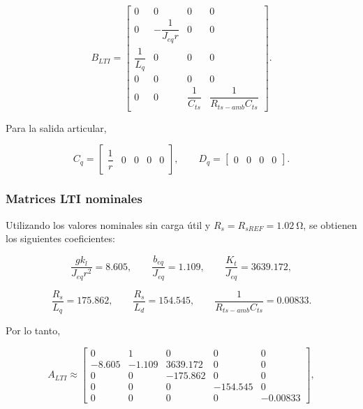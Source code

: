 \documentclass[10pt,a4paper]{article}
\begin{document}
\begin{equation}
    B_{LTI}=
    \begin{bmatrix}
        0 & 0 & 0 & 0\\[1mm]
        0 & -\dfrac{1}{J_{eq}r} & 0 & 0\\[4mm]
        \dfrac{1}{L_q} & 0 & 0 & 0\\[4mm]
        0 & 0 & 0 & 0\\[4mm]
        0 & 0 & \dfrac{1}{C_{ts}} & \dfrac{1}{R_{ts-amb}C_{ts}}
    \end{bmatrix}.
    \label{eq:b_lti_simbolica}
\end{equation}

Para la salida articular,

\begin{equation}
    C_q=\begin{bmatrix}\dfrac{1}{r} & 0 & 0 & 0 & 0\end{bmatrix},
    \qquad
    D_q=\begin{bmatrix}0 & 0 & 0 & 0\end{bmatrix}.
    \label{eq:cq_lti}
\end{equation}

\subsubsection{Matrices LTI nominales}

Utilizando los valores nominales sin carga útil y \(R_s=R_{sREF}=\SI{1.02}{\ohm}\), se obtienen los siguientes coeficientes:

\begin{equation}
    \frac{gk_l}{J_{eq}r^2}=8.605,
    \qquad
    \frac{b_{eq}}{J_{eq}}=1.109,
    \qquad
    \frac{K_t}{J_{eq}}=3639.172,
\end{equation}

\begin{equation}
    \frac{R_s}{L_q}=175.862,
    \qquad
    \frac{R_s}{L_d}=154.545,
    \qquad
    \frac{1}{R_{ts-amb}C_{ts}}=0.00833.
\end{equation}

Por lo tanto,

\begin{equation}
    A_{LTI}\approx
    \begin{bmatrix}
        0 & 1 & 0 & 0 & 0\\
        -8.605 & -1.109 & 3639.172 & 0 & 0\\
        0 & 0 & -175.862 & 0 & 0\\
        0 & 0 & 0 & -154.545 & 0\\
        0 & 0 & 0 & 0 & -0.00833
    \end{bmatrix},
    \label{eq:a_lti_numerica}
\end{equation}
\end{document}
